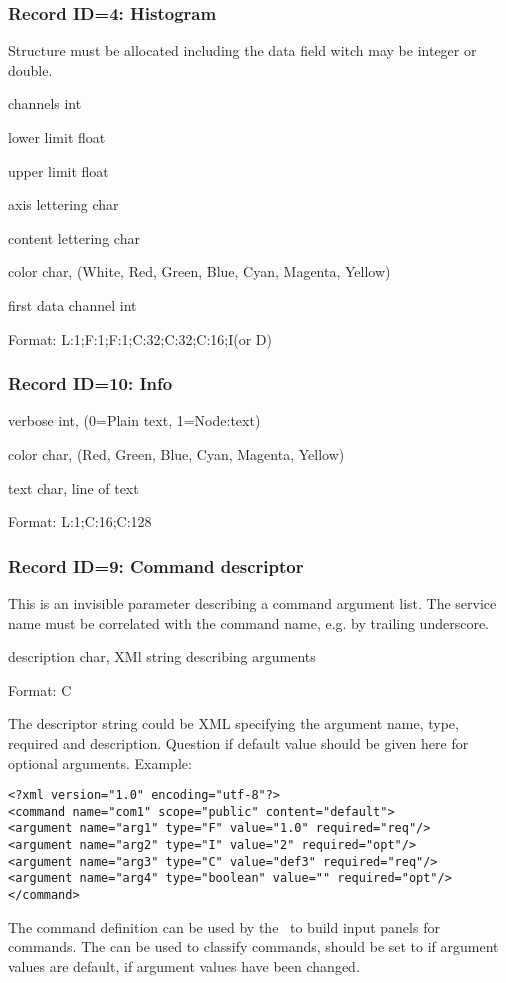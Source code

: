 \subsubsection{Record ID=4: Histogram}
Structure must be allocated including the data field witch may be integer or double.
\begin{compactdesc}
\item[channels]   int 
\item[lower limit]   float 
\item[upper limit]   float 
\item[axis lettering]   char 
\item[content lettering]   char 
\item[color]   char, (White, Red, Green, Blue, Cyan, Magenta, Yellow)
\item[first data channel]   int 
\item[Format:] L:1;F:1;F:1;C:32;C:32;C:16;I(or D)
\end{compactdesc}

\subsubsection{Record ID=10: Info}
\begin{compactdesc}
\item[verbose]   int,  (0=Plain text, 1=Node:text)
\item[color]   char,  (Red, Green, Blue, Cyan, Magenta, Yellow)
\item[text]   char,  line of text
\item[Format:] L:1;C:16;C:128
\end{compactdesc}

\subsubsection{Record ID=9: Command descriptor}
This is an invisible parameter describing a command argument list. The service name must be correlated with the command name, e.g. by trailing underscore.
\begin{compactdesc}
\item[description]   char,  XMl string describing arguments
\item[Format:] C
\end{compactdesc}

The descriptor string could be XML specifying the argument name, type, required and description. Question if default value should be given here for optional arguments. Example:
{\small \begin{verbatim}
<?xml version="1.0" encoding="utf-8"?>
<command name="com1" scope="public" content="default">
<argument name="arg1" type="F" value="1.0" required="req"/>
<argument name="arg2" type="I" value="2" required="opt"/>
<argument name="arg3" type="C" value="def3" required="req"/>
<argument name="arg4" type="boolean" value="" required="opt"/>
</command>
\end{verbatim}
}
The command definition can be used by the \gui\ to build input panels for commands. The  can be used to classify commands,  should be set to  if argument values are default,  if argument values have been changed.
